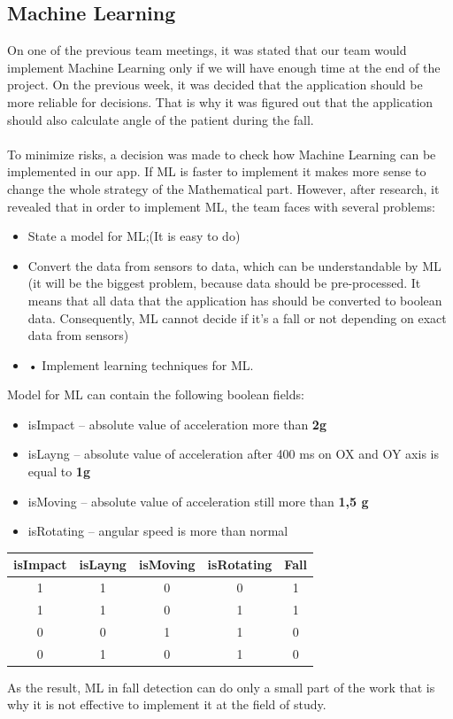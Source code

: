 \documentclass[conference,12pt]{IEEETran}
\begin{document}
\subsection{Machine Learning}
On one of the previous team meetings, it was stated that our team would implement Machine Learning only if we will have enough time at the end of the project. On the previous week, it was decided that the application should be more reliable for decisions. That is why it was figured out that the application should also calculate angle of the patient during the fall.\\\\
To minimize risks, a decision was made to check how Machine Learning can be implemented in our app. If ML is faster to implement it makes more sense to change the whole strategy of the Mathematical part. However, after research, it revealed that in order to implement ML, the team faces with several problems:
\begin{itemize}
	\item State a model for ML;(It is easy to do)
	\item Convert the data from sensors to data, which can be understandable by ML (it will be the biggest problem, because data should be pre-processed. It means that all data that the application has should be converted to boolean data. Consequently, ML cannot decide if it's a fall or not depending on exact data from sensors)
	\item •	Implement learning techniques for ML.
\end{itemize}
Model for ML can contain the following boolean fields: 
\begin{itemize}
	\item isImpact – absolute value of acceleration more than \textbf{2g}
	\item isLayng – absolute value of acceleration after 400 ms on OX and OY axis is equal to \textbf{1g}
	\item isMoving – absolute value of acceleration still more than \textbf{1,5 g}
	\item isRotating – angular speed is more than normal
\end{itemize}

\begin{table}[!h]	
	\begin{center}
		{\renewcommand{\arraystretch}{2}%
		\begin{tabular}{|c|c|c|c|c|} 
			\hline
			\textbf{isImpact} & \textbf{isLayng} & \textbf{isMoving} &\textbf{isRotating} & \textbf{Fall} \\ [0.5ex] 
			\hline
			1 & 1 & 0 & 0 & 1 \\ 
			\hline
			1 & 1 & 0 & 1 & 1 \\
			\hline
			0 & 0 & 1 & 1 & 0 \\
			\hline
			0 & 1 & 0 & 1 & 0 \\  [1ex]
			\hline  
		\end{tabular}
	}
	\end{center}
\end{table}
As the result, ML in fall detection can do only a small part of the work that is why it is not effective to implement it at the field of study. 
\end{document}
